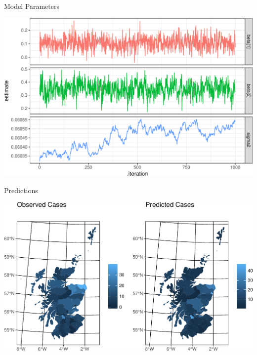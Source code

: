 \documentclass[11pt,ignorenonframetext,]{beamer}
\begin{document}
\begin{frame}{Model Parameters}
\protect\hypertarget{model-parameters}{}

\begin{center}\includegraphics[width=\textwidth]{Lec19_files/figure-beamer/unnamed-chunk-19-1} \end{center}

\end{frame}

\begin{frame}{Predictions}
\protect\hypertarget{predictions}{}

\begin{center}\includegraphics[width=\textwidth]{Lec19_files/figure-beamer/unnamed-chunk-20-1} \end{center}

\end{frame}
\end{document}

